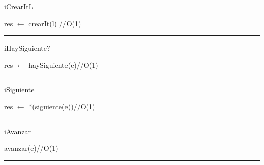 \begin{algorithm}[H]
\caption{iCrearItL}
\begin{algorithmic}[1]
\State res $\gets$ crearIt(l) \hfill //O(1)
\EndFunction 
\end{algorithmic}
\hrule
{}
\end{algorithm}

\begin{algorithm}[H]
\caption{iHaySiguiente?}
\begin{algorithmic}[1]
\state res $\gets$ haySiguiente(e)\hfill //O(1)
\EndFunction 
\end{algorithmic}
\hrule
{}
\end{algorithm}


\begin{algorithm}[H]
\caption{iSiguiente}
\begin{algorithmic}[1]
\state res $\gets$ *(siguiente(e))\hfill //O(1)
\EndFunction 
\end{algorithmic}
\hrule
{}
\end{algorithm}

\begin{algorithm}[H]
\caption{iAvanzar}
\begin{algorithmic}[1]
\state avanzar(e)\hfill //O(1)
\EndFunction 
\end{algorithmic}
\hrule
{}
\end{algorithm}

